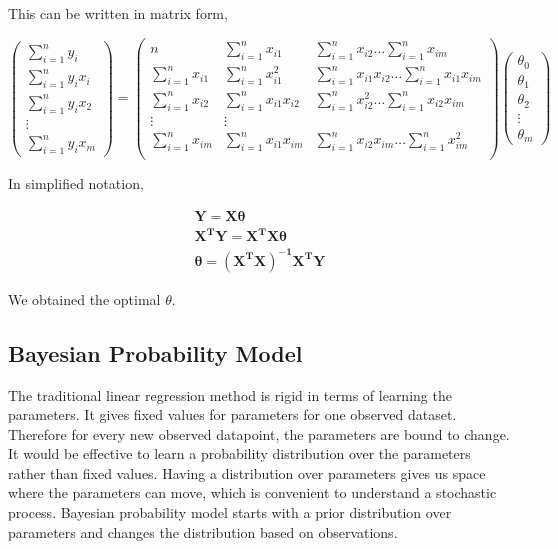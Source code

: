 \documentclass[english]{tktltiki}
\begin{document}
This can be written in matrix form,

$$
\begin{pmatrix}
\sum_{i=1}^n y_i \\
\sum_{i=1}^n y_i x_i \\
\sum_{i=1}^n y_i x_2 \\
\vdots \\
\sum_{i=1}^n y_i x_m
\end{pmatrix}
=%
\begin{pmatrix}
n & \sum_{i=1}^n x_{i1} & \sum_{i=1}^n x_{i2} \hdots \sum_{i=1}^n x_{im} \\
\sum_{i=1}^n x_{i1} & \sum_{i=1}^n x_{i1}^2 & \sum_{i=1}^n x_{i1} x_{i2} \hdots \sum_{i=1}^n x_{i1} x_{im} \\
\sum_{i=1}^n x_{i2} & \sum_{i=1}^n x_{i1} x_{i2} & \sum_{i=1}^n x_{i2}^2 \hdots \sum_{i=1}^n x_{i2} x_{im} \\
\vdots&\vdots \\
\sum_{i=1}^n x_{im} & \sum_{i=1}^n x_{i1} x_{im} & \sum_{i=1}^n x_{i2} x_{im} \hdots \sum_{i=1}^n x_{im}^2 \\
\end{pmatrix}
%
\begin{pmatrix}
\theta_0 \\
\theta_1 \\
\theta_2 \\
\vdots \\
\theta_m
\end{pmatrix}
$$

In simplified notation,

\begin{eqnarray}
\mathbf{Y} = \mathbf{X \theta} \nonumber \\
\mathbf{X^TY} = \mathbf{X^T X \theta} \nonumber \\
\mathbf{\theta} = \mathbf{(X^T X)^{-1} X^T Y}
\end{eqnarray}

We obtained the optimal $\theta$.

\subsection{Bayesian Probability Model}

The traditional linear regression method is rigid in terms of learning the parameters. It gives fixed values for parameters for one observed dataset. Therefore for every new observed datapoint, the parameters are bound to change. It would be effective to learn a probability distribution over the parameters rather than fixed values. Having a distribution over parameters gives us space where the parameters can move, which is convenient to understand a stochastic process. Bayesian probability model starts with a prior distribution over parameters and changes the distribution based on observations.
\end{document}

